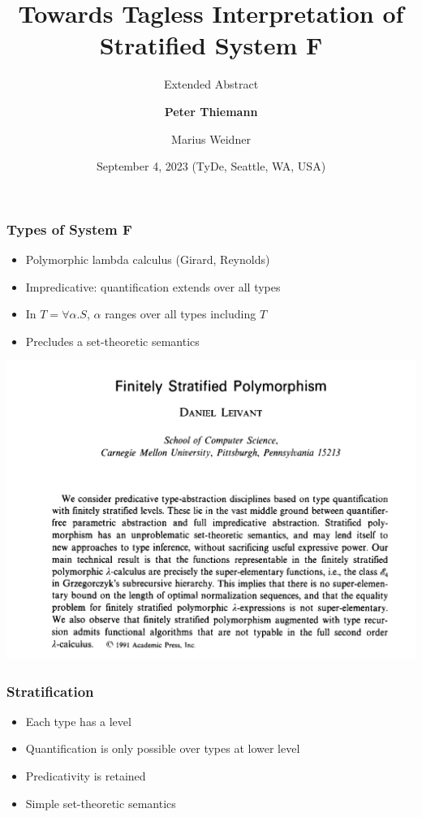 \documentclass[dvipsnames,aspectratio=169,pdftex]{beamer}
\title{Towards Tagless Interpretation of Stratified System F}
\subtitle{Extended Abstract}
\author[Thiemann, Weidner]
{
\textbf{Peter Thiemann} \and
{Marius Weidner} 
}
\institute{University of Freiburg, Germany
}
\date{September 4, 2023 (TyDe, Seattle, WA, USA)}
\begin{document}
\begin{frame}{\null}
  \titlepage 
\end{frame}
\begin{frame}
  \frametitle{Types of System F}
  \SFType
  \begin{itemize}
  \item Polymorphic lambda calculus (Girard, Reynolds)
  \item Impredicative: quantification extends over all types
  \item In $T = \forall \alpha.S$, $\alpha$ ranges over all types including $T$
  \item Precludes a set-theoretic semantics
  \end{itemize}
\end{frame}
\begin{frame}
  \begin{center}
    \includegraphics[scale=0.25]{images/FinitelyStratifiedPolymorphism.png}
  \end{center}
\end{frame}
\begin{frame}
  \frametitle{Stratification}
  \begin{itemize}
  \item Each type has a level
  \item Quantification is only possible over types at lower level
  \item Predicativity is retained
  \item Simple set-theoretic semantics
  \end{itemize}
  \pause
  \TFType
  \pause\vspace{-2\baselineskip}
  \TFlevel
\end{frame}
\end{document}
